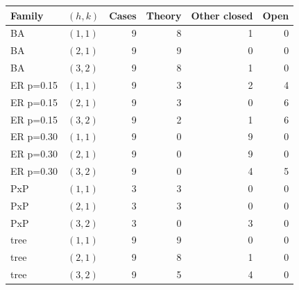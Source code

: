 \begin{tabular}{llrrrr}
\toprule
Family & $(h,k)$ & Cases & Theory & Other closed & Open\\
\midrule
BA & $(1,1)$ & 9 & 8 & 1 & 0\\
BA & $(2,1)$ & 9 & 9 & 0 & 0\\
BA & $(3,2)$ & 9 & 8 & 1 & 0\\
ER p=0.15 & $(1,1)$ & 9 & 3 & 2 & 4\\
ER p=0.15 & $(2,1)$ & 9 & 3 & 0 & 6\\
ER p=0.15 & $(3,2)$ & 9 & 2 & 1 & 6\\
ER p=0.30 & $(1,1)$ & 9 & 0 & 9 & 0\\
ER p=0.30 & $(2,1)$ & 9 & 0 & 9 & 0\\
ER p=0.30 & $(3,2)$ & 9 & 0 & 4 & 5\\
PxP & $(1,1)$ & 3 & 3 & 0 & 0\\
PxP & $(2,1)$ & 3 & 3 & 0 & 0\\
PxP & $(3,2)$ & 3 & 0 & 3 & 0\\
tree & $(1,1)$ & 9 & 9 & 0 & 0\\
tree & $(2,1)$ & 9 & 8 & 1 & 0\\
tree & $(3,2)$ & 9 & 5 & 4 & 0\\
\bottomrule
\end{tabular}
